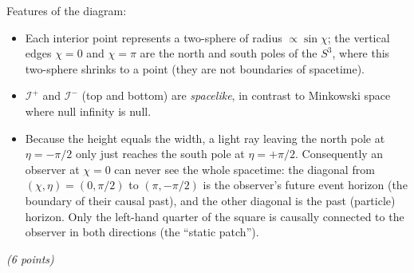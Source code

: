 \documentclass[12pt]{article}
\newcounter{quesno}
\newcommand{\ques}[1]{\vspace{2em}\stepcounter{quesno}
\noindent{\bf Question \thequesno.} \emph{(#1 points)}\par\medskip}
\begin{document}
\begin{enumerate}[label=\alph*)]
Features of the diagram:
\begin{itemize}
\item Each interior point represents a two-sphere of radius $\propto\sin\chi$; the vertical edges $\chi=0$ and $\chi=\pi$
are the north and south poles of the $S^3$, where this two-sphere shrinks to a point (they are not boundaries of spacetime).
\item $\mathcal{I}^+$ and $\mathcal{I}^-$ (top and bottom) are \emph{spacelike}, in contrast to Minkowski space where null
infinity is null.
\item Because the height equals the width, a light ray leaving the north pole at $\eta=-\pi/2$ only just reaches the south pole at
$\eta=+\pi/2$. Consequently an observer at $\chi=0$ can never see the whole spacetime: the diagonal from $(\chi,\eta)=(0,\pi/2)$
to $(\pi,-\pi/2)$ is the observer's future event horizon (the boundary of their causal past), and the other diagonal is the
past (particle) horizon. Only the left-hand quarter of the square is causally connected to the observer in both directions
(the ``static patch'').
\end{itemize}
\end{enumerate}

\ques{6}
\end{document}
